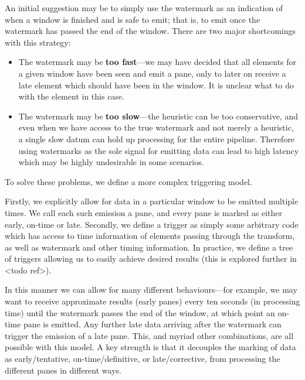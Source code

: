 An initial suggestion may be to simply use the watermark as an indication of when a window is finished and is safe to emit; that is, to emit once the watermark has passed the end of the window.
There are two major shortcomings with this strategy:
\begin{itemize}
	\item The watermark may be \textbf{too fast}---we may have decided that all elements for a given window have been seen and emit a pane, only to later on receive a late element which should have been in the window.
	It is unclear what to do with the element in this case.
	
	\item The watermark may be \textbf{too slow}---the heuristic can be too conservative, and even when we have access to the true watermark and not merely a heuristic, a single slow datum can hold up processing for the entire pipeline.
	Therefore using watermarks as the sole signal for emitting data can lead to high latency which may be highly undesirable in some scenarios.
\end{itemize} 

To solve these problems, we define a more complex triggering model.

Firstly, we explicitly allow for data in a particular window to be emitted multiple times.
We call each such emission a pane, and every pane is marked as either early, on-time or late.
Secondly, we define a trigger as simply some arbitrary code which has access to time information of elements passing through the transform, as well as watermark and other timing information.
In practice, we define a tree of triggers allowing us to easily achieve desired results (this is explored further in <todo ref>). 

In this manner we can allow for many different behaviours---for example, we may want to receive approximate results (early panes) every ten seconds (in processing time) until the watermark passes the end of the window, at which point an on-time pane is emitted.
Any further late data arriving after the watermark can trigger the emission of a late pane.
This, and myriad other combinations, are all possible with this model.
A key strength is that it decouples the marking of data as early/tentative, on-time/definitive, or late/corrective, from processing the different panes in different ways.


